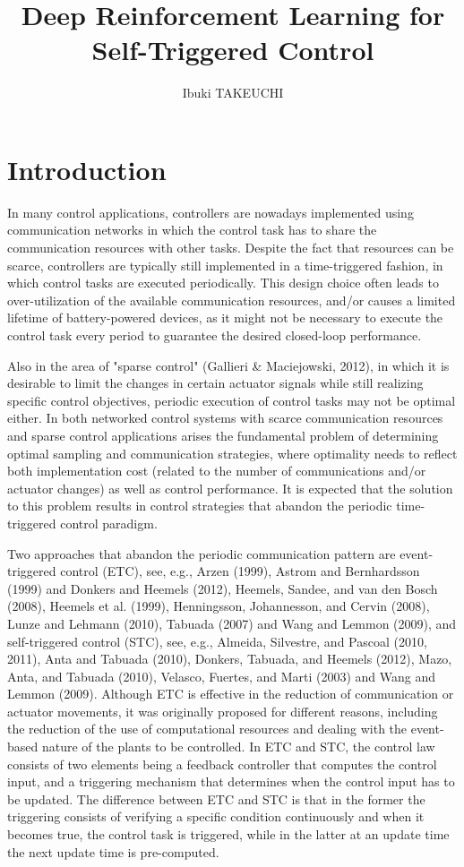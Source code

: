 \documentclass[english, dvipdfmx]{ampmt}             %
\title[Deep Reinforcement Learning for Self-Triggered Control]
      {Deep Reinforcement Learning for Self-Triggered Control}
\author{Ibuki TAKEUCHI}
\begin{document}
\ifoutputbody
\makeinsidecover                %
\makeabstract                   %
\maketoc                        %
\setcounter{page}{1}
\section{Introduction}
 In many control applications, controllers are nowadays implemented using communication networks in which the control task has to share the communication resources with other tasks. Despite the fact that resources can be scarce, controllers are typically still implemented in a time-triggered fashion, in which control tasks are executed periodically. This design choice often leads to over-utilization of the available communication resources, and/or causes a limited lifetime of battery-powered devices, as it might not be necessary to execute the control task every period to guarantee the desired closed-loop performance. \par
Also in the area of "sparse control" (Gallieri \& Maciejowski, 2012), in which it is desirable to limit the changes in certain actuator signals while still realizing specific control objectives, periodic execution of control tasks may not be optimal either. In both networked control systems with scarce communication resources and sparse control applications arises the fundamental problem of determining optimal sampling and communication strategies, where optimality needs to reflect both implementation cost (related to the number of communications and/or actuator changes) as well as control performance. It is expected that the solution to this problem results in control strategies that abandon the periodic time-triggered control paradigm. \par
Two approaches that abandon the periodic communication pattern are event-triggered control (ETC), see, e.g., Arzen (1999), Astrom and Bernhardsson (1999) and Donkers and Heemels (2012), Heemels, Sandee, and van den Bosch (2008), Heemels et al. (1999), Henningsson, Johannesson, and Cervin (2008), Lunze and Lehmann (2010), Tabuada (2007) and Wang and Lemmon (2009), and self-triggered control (STC), see, e.g., Almeida, Silvestre, and Pascoal (2010, 2011), Anta and Tabuada (2010), Donkers, Tabuada, and Heemels (2012), Mazo, Anta, and Tabuada (2010), Velasco, Fuertes, and Marti (2003) and Wang and Lemmon (2009). Although ETC is effective in the reduction of communication or actuator movements, it was originally proposed for different reasons, including the reduction of the use of computational resources and dealing with the event-based nature of the plants to be controlled. In ETC and STC, the control law consists of two elements being a feedback controller that computes the control input, and a triggering mechanism that determines when the control input has to be updated. The difference between ETC and STC is that in the former the triggering consists of verifying a specific condition continuously and when it becomes true, the control task is triggered, while in the latter at an update time the next update time is pre-computed. \par
\end{document}
